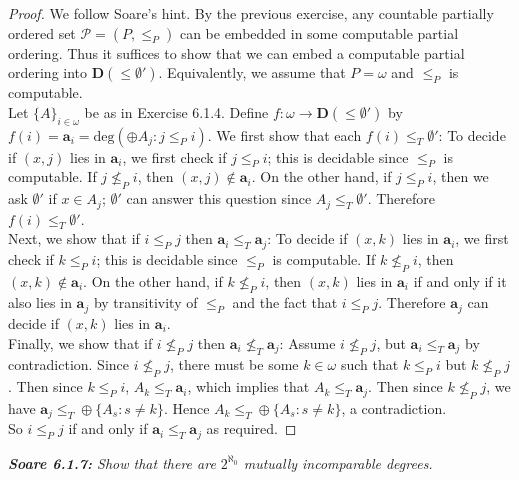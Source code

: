 \documentclass{article}
\begin{document}
  \begin{proof}
    We follow Soare's hint. By the previous exercise, any countable
    partially ordered set $\mathcal{P}=(P,\leq_P)$ can be embedded in some
    computable partial ordering. Thus it suffices to show that we can embed
    a computable partial ordering into $\bm{D}(\leq\emptyset')$.
    Equivalently, we assume that $P=\omega$ and $\leq_P$ is computable. \\

    Let $\{A\}_{i\in\omega}$ be as in Exercise 6.1.4. Define
    $f:\omega\rightarrow \bm{D}(\leq\emptyset')$ by
    $f(i)=\bm{a}_i=\text{deg}(\oplus A_j:j\leq_P i)$. We first show that
    each $f(i)\leq_T\emptyset'$: To decide if $(x,j)$ lies in $\bm{a}_i$,
    we first check if $j\leq_P i$; this is decidable since $\leq_P$ is
    computable. If $j\not\leq_P i$, then $(x,j)\not\in\bm{a}_i$. On the
    other hand, if $j\leq_P i$, then we ask $\emptyset'$ if $x\in A_j$;
    $\emptyset'$ can answer this question since $A_j\leq_T\emptyset'$.
    Therefore $f(i)\leq_T\emptyset'$. \\

    Next, we show that if $i\leq_P j$ then $\bm{a}_i\leq_T\bm{a}_j$: To
    decide if $(x,k)$ lies in $\bm{a}_i$, we first check if $k\leq_P i$;
    this is decidable since $\leq_P$ is computable. If $k\not\leq_P i$,
    then $(x,k)\not\in\bm{a}_i$. On the other hand, if $k\not\leq_P i$,
    then $(x,k)$ lies in $\bm{a}_i$ if and only if it also lies in
    $\bm{a}_j$ by transitivity of $\leq_P$ and the fact that $i\leq_P j$.
    Therefore $\bm{a}_j$ can decide if $(x,k)$ lies in $\bm{a}_i$. \\

    Finally, we show that if $i\not\leq_P j$ then
    $\bm{a}_i\not\leq_T\bm{a}_j$: Assume $i\not\leq_P j$, but
    $\bm{a}_i\leq_T\bm{a}_j$ by contradiction. Since $i\not\leq_P j$, there
    must be some $k\in\omega$ such that $k\leq_P i$ but $k\not\leq_P j$.
    Then since $k\leq_P i$, $A_k\leq_T\bm{a}_i$, which implies that
    $A_k\leq_T\bm{a}_j$. Then since $k\not\leq_P j$, we have $\bm{a}_j\leq_T
    \oplus\{A_s:s\neq k\}$. Hence $A_k\leq_T \oplus\{A_s:s\neq k\}$,
    a contradiction. \\

    So $i\leq_P j$ if and only if $\bm{a}_i\leq_T\bm{a}_j$ as required.
  \end{proof}

\it \textbf{Soare 6.1.7:} Show that there are $2^{\aleph_0}$ mutually
  incomparable degrees.
\end{document}
